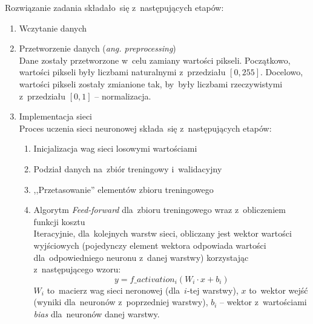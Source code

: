 \documentclass[11pt, a4paper]{article}
\begin{document}
Rozwiązanie zadania składało~się z~następujących etapów:
\begin{enumerate}
    \item Wczytanie danych
    \item Przetworzenie danych (\textit{ang. preprocessing}) \\
    Dane zostały przetworzone w~celu zamiany wartości pikseli. Początkowo, wartości pikseli były liczbami naturalnymi z~przedziału $[0, 255]$. Docelowo, wartości pikseli zostały zmianione tak, by~były liczbami rzeczywistymi z~przedziału $[0, 1]$ -- normalizacja.
    \item Implementacja sieci \\
    Proces uczenia sieci neuronowej składa~się z~następujących etapów:
    \begin{enumerate}
        \item Inicjalizacja wag sieci losowymi wartościami
        \item Podział danych na~zbiór treningowy i~walidacyjny
        \item ,,Przetasowanie'' elementów zbioru treningowego
        \item Algorytm \textit{Feed-forward} dla~zbioru treningowego wraz z~obliczeniem funkcji kosztu \\
        Iteracyjnie, dla~kolejnych warstw sieci, obliczany jest wektor wartości wyjściowych (pojedynczy element wektora odpowiada wartości dla~odpowiedniego neuronu z~danej warstwy) korzystając z~następującego wzoru:
        \begin{equation}
            y = f\_activation_i(W_i \cdot x + b_i)
        \end{equation}
        $W_i$ to~macierz wag sieci neronowej (dla~$i$-tej warstwy), $x$ to~wektor wejść (wyniki dla~neuronów z~poprzedniej warstwy), $b_i$ -- wektor z~wartościami \textit{bias} dla~neuronów danej warstwy.
        

\end{enumerate}
\end{enumerate}
\end{document}
